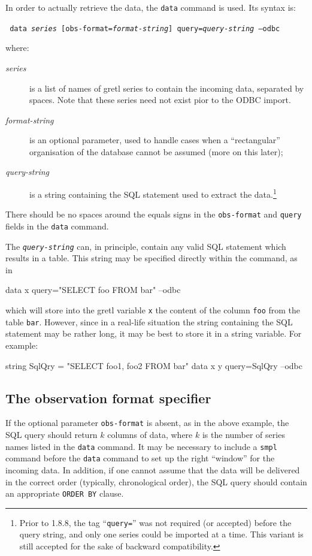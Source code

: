 In order to actually retrieve the data, the \texttt{data} command is
used. Its syntax is:
\begin{flushleft}
\texttt{%
  data \emph{series} [obs-format=\emph{format-string}] query=\emph{query-string} --odbc
}
\end{flushleft}
where:
\begin{description}
\item[\emph{series}] is a list of names of gretl series to contain the
  incoming data, separated by spaces.  Note that these series need not
  exist pior to the ODBC import.
\item[\emph{format-string}] is an optional parameter, used to handle
  cases when a ``rectangular'' organisation of the database cannot be
  assumed (more on this later);
\item[\emph{query-string}] is a string containing the SQL statement
  used to extract the data.\footnote{Prior to  1.8.8, the
    tag ``\texttt{query=}'' was not required (or accepted) before the query
    string, and only one series could be imported at a time.  This
    variant is still accepted for the sake of backward compatibility.}
\end{description}
%
There should be no spaces around the equals signs in the
\texttt{obs-format} and \texttt{query} fields in the \texttt{data}
command.

The \texttt{\emph{query-string}} can, in principle, contain any valid
SQL statement which results in a table. This string may be specified
directly within the command, as in
\begin{code}
  data x query="SELECT foo FROM bar" --odbc
\end{code}
which will store into the gretl variable \texttt{x} the content of the
column \texttt{foo} from the table \texttt{bar}. However, since in a
real-life situation the string containing the SQL statement may be
rather long, it may be best to store it in a string variable.  For
example:
\begin{code}
  string SqlQry = "SELECT foo1, foo2 FROM bar"
  data x y query=SqlQry --odbc
\end{code}

\subsection{The observation format specifier}

If the optional parameter \texttt{obs-format} is absent, as in the
above example, the SQL query should return $k$ columns of data, where
$k$ is the number of series names listed in the \texttt{data} command.
It may be necessary to include a \texttt{smpl} command before the
\texttt{data} command to set up the right ``window'' for the incoming
data.  In addition, if one cannot assume that the data will be
delivered in the correct order (typically, chronological order), the
SQL query should contain an appropriate \texttt{ORDER BY} clause.

